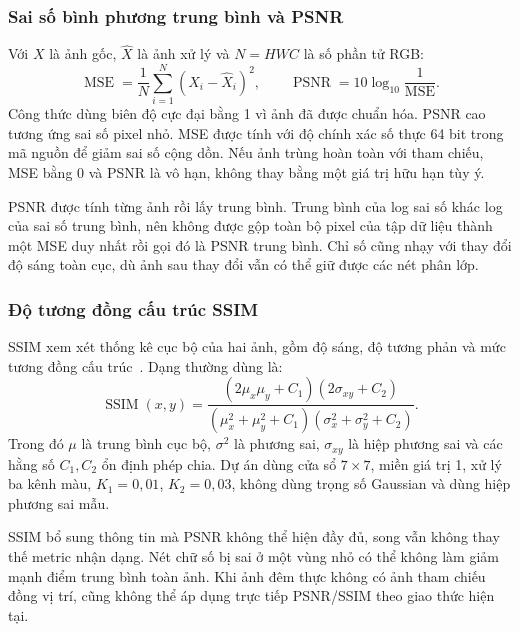 \subsubsection{Sai số bình phương trung bình và PSNR}
Với $X$ là ảnh gốc, $\widehat{X}$ là ảnh xử lý và $N=HWC$ là số phần tử RGB:
\begin{equation}
\operatorname{MSE}=\frac{1}{N}\sum_{i=1}^{N}(X_i-\widehat{X}_i)^2,
\qquad \operatorname{PSNR}=10\log_{10}\frac{1}{\operatorname{MSE}}.
\end{equation}
Công thức dùng biên độ cực đại bằng 1 vì ảnh đã được chuẩn hóa. PSNR cao tương ứng sai số pixel nhỏ. MSE được tính với độ chính xác số thực 64 bit trong mã nguồn để giảm sai số cộng dồn. Nếu ảnh trùng hoàn toàn với tham chiếu, MSE bằng 0 và PSNR là vô hạn, không thay bằng một giá trị hữu hạn tùy ý.

PSNR được tính từng ảnh rồi lấy trung bình. Trung bình của log sai số khác log của sai số trung bình, nên không được gộp toàn bộ pixel của tập dữ liệu thành một MSE duy nhất rồi gọi đó là PSNR trung bình. Chỉ số cũng nhạy với thay đổi độ sáng toàn cục, dù ảnh sau thay đổi vẫn có thể giữ được các nét phân lớp.

\subsubsection{Độ tương đồng cấu trúc SSIM}
SSIM xem xét thống kê cục bộ của hai ảnh, gồm độ sáng, độ tương phản và mức tương đồng cấu trúc~\cite{ssim}. Dạng thường dùng là:
\begin{equation}
\operatorname{SSIM}(x,y)=
\frac{(2\mu_x\mu_y+C_1)(2\sigma_{xy}+C_2)}
{(\mu_x^2+\mu_y^2+C_1)(\sigma_x^2+\sigma_y^2+C_2)}.
\end{equation}
Trong đó $\mu$ là trung bình cục bộ, $\sigma^2$ là phương sai, $\sigma_{xy}$ là hiệp phương sai và các hằng số $C_1,C_2$ ổn định phép chia. Dự án dùng cửa sổ $7\times7$, miền giá trị 1, xử lý ba kênh màu, $K_1=0,01$, $K_2=0,03$, không dùng trọng số Gaussian và dùng hiệp phương sai mẫu.

SSIM bổ sung thông tin mà PSNR không thể hiện đầy đủ, song vẫn không thay thế metric nhận dạng. Nét chữ số bị sai ở một vùng nhỏ có thể không làm giảm mạnh điểm trung bình toàn ảnh. Khi ảnh đêm thực không có ảnh tham chiếu đồng vị trí, cũng không thể áp dụng trực tiếp PSNR/SSIM theo giao thức hiện tại.
